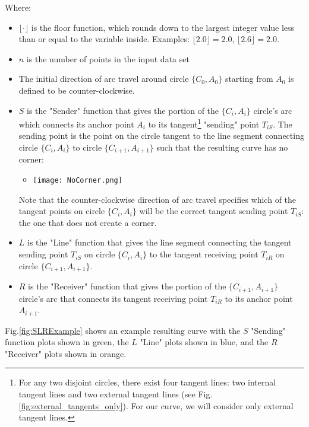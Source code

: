 \documentclass{article}
\begin{document}
Where:
\begin{itemize}
    \item $\lfloor \cdot \rfloor$ is the floor function, which rounds down to the largest integer value less than or equal to the variable inside. Examples: $\lfloor 2.0 \rfloor = 2.0$, $\lfloor 2.6 \rfloor = 2.0$.
    \item $n$ is the number of points in the input data set
    \item The initial direction of arc travel around circle $\{C_0, A_0\}$ starting from $A_0$ is defined to be counter-clockwise.
    \item $S$ is the "Sender" function that gives the portion of the $\{C_i, A_i\}$ circle's arc which connects its anchor point $A_i$ to its tangent\footnote{For any two disjoint circles, there exist four tangent lines: two internal tangent lines and two external tangent lines (see Fig.     \ref{fig:external_tangents_only}). For our curve, we will consider only external tangent lines.} "sending" point $T_{iS}$. The sending point is the point on the circle tangent to the line segment connecting circle $\{C_i, A_i\}$ to circle $\{C_{i+1}, A_{i+1}\}$ such that the resulting curve has no corner:
    \begin{itemize}
        \item \texttt{[image: NoCorner.png]}
    \end{itemize}
    Note that the counter-clockwise direction of arc travel specifies which of the tangent points on circle $\{C_i, A_i\}$ will be the correct tangent sending point $T_{iS}$: the one that does not create a corner.
    \item $L$ is the "Line" function that gives the line segment connecting the tangent sending point $T_{iS}$ on circle $\{C_i, A_i\}$ to the tangent receiving point $T_{iR}$ on circle $\{C_{i+1}, A_{i+1}\}$.
    \item $R$ is the "Receiver" function that gives the portion of the $\{C_{i+1}, A_{i+1}\}$ circle's arc that connects its tangent receiving point $T_{iR}$ to its anchor point $A_{i+1}$.
\end{itemize}
Fig.\ref{fig:SLRExample} shows an example resulting curve with the $S$ "Sending" function plots shown in green, the $L$ "Line" plots shown in blue, and the $R$ "Receiver" plots shown in orange.
\end{document}
